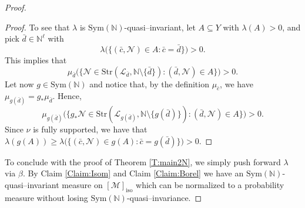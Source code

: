 \documentclass[11pt]{amsart}
\theoremstyle{plain}
\newtheorem{claim}[theorem]{Claim}
\theoremstyle{definition}
\newcommand{\N}{\mathbb{N}}
\begin{document}
\begin{proof}
\begin{proof}
To see that $\lambda$ is  $\mathrm{Sym}(\N)$-quasi--invariant, let $A\subseteq Y$ with $\lambda(A)>0$, and pick  $\bar{d}\in \N^\ell$ with
\[\lambda\big( \{(\bar{c},\mathcal{N})\in A \colon \bar{c}=\bar{d} \} \big)>0. \]
This implies that 
\[\mu_{\bar{d}}\big(\{\mathcal{N} \in \mathrm{Str}(\mathcal{L}_{\bar d},\N \setminus \{\bar{d}\}) \colon (\bar{d},\mathcal{N})\in A \} \big)>0.\]
Let now $g\in \mathrm{Sym}(\N)$ and notice that, by the definition $\mu_{\bar{c}}$, we have $\mu_{g(\bar{d})}=g_*\mu_{\bar{d}}$. Hence,
\[\mu_{g(\bar{d})}\big(\{g_*\mathcal{N} \in \mathrm{Str}(\mathcal{L}_{g(\bar d)},\N \setminus \{g(\bar{d})\}) \colon (\bar{d},\mathcal{N})\in A \} \big)>0.\]
Since $\nu$ is fully supported, we have that $\lambda(g(A))\geq \lambda\big( \{(\bar{c},\mathcal{N})\in g(A) \colon \bar{c}=g(\bar{d}) \} \big)>0$.



\end{proof}



To conclude with the proof of Theorem \ref{T:main2N}, we simply push forward  $\lambda$ via $\beta$. By  Claim \ref{Claim:Isom} and Claim \ref{Claim:Borel} we have an $\mathrm{Sym}(\mathbb{N})$-quasi--invariant measure on $[\mathcal{M}]_{\mathrm{iso}}$ which can be normalized to a probability measure without losing $\mathrm{Sym}(\mathbb{N})$-quasi--invariance.
\end{proof}











\end{document}
